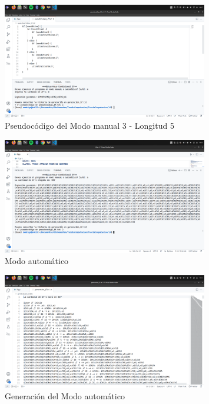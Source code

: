 \documentclass[11pt]{article} %
\begin{document}
	\begin{figure}[h]
		\centering
		\includegraphics[width=0.8\textwidth]{3,2}
		\caption{Pseudocódigo del Modo manual 3 - Longitud 5}
	\end{figure}
	
	
	
	\newpage
	\begin{figure}[h]
		\centering
		\includegraphics[width=0.8\textwidth]{auto.png}
		\caption{Modo automático}
	\end{figure}
	
	\begin{figure}[h]
		\centering
		\includegraphics[width=0.8\textwidth]{arch4,1}
		\caption{Generación del Modo automático}
	\end{figure}
	
	
	\newpage
	
\end{document}
